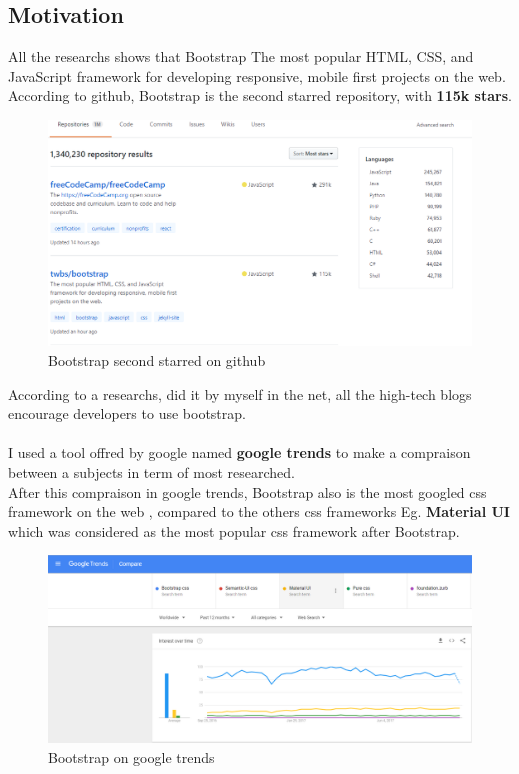 \documentclass[12pt]{article}
\begin{document}
	\subsection{Motivation}
	All the researchs shows that Bootstrap The most popular HTML, CSS, and JavaScript framework for developing responsive, mobile first projects on the web.
	\\
	According to github, Bootstrap is the second starred repository, with \textbf{115k stars}.
	\begin{figure}[h]
		\centering
		\includegraphics[width=1\textwidth]{Boostrap_statics_github.png}
		\caption{Bootstrap second starred on github}
	\end{figure}
	
	\vspace{66mm}
	
	According to a researchs, did it by myself in the net, all the high-tech blogs encourage developers to use bootstrap.
	\\
	\\
	I used a tool offred by google named \textbf{google trends} to make a compraison between a subjects in term of most researched.
	\\
	After this compraison in google trends, Bootstrap also is the most googled css framework on the web , compared to the others css frameworks Eg. \textbf{Material UI} which was considered as the most popular css framework after Bootstrap.
	
	\begin{figure}[h]
		\centering
		\includegraphics[width=1\textwidth]{Boostrap_statics_google_trends.png}
		\caption{Bootstrap on google trends}
	\end{figure}
	\vspace{66mm}
\end{document}
